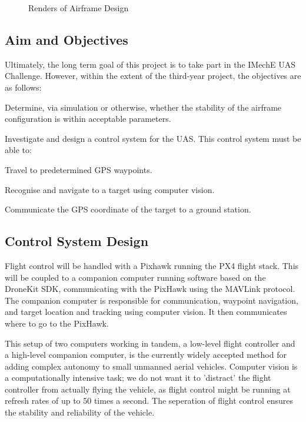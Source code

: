 \documentclass[11pt]{article}
\begin{document}
\begin{figure}[h]
    \caption{Renders of Airframe Design\cite{Ismail_paper}}
    \label{fig:saucy_render}
\end{figure}



\subsection{Aim and Objectives}
Ultimately, the long term goal of this project is to take part in the IMechE UAS Challenge. However, within the extent of the third-year project, the objectives are as follows:

\begin{compactenum}
    \item Determine, via simulation or otherwise, whether the stability of the airframe configuration is within acceptable parameters.
    \item Investigate and design a control system for the UAS. This control system must be able to:
    \begin{compactenum}
        \item Travel to predetermined GPS waypoints.
        \item Recognise and navigate to a target using computer vision.
        \item Communicate the GPS coordinate of the target to a ground station.
    \end{compactenum}
\end{compactenum}

\subsection{Control System Design}
Flight control will be handled with a Pixhawk running the PX4 flight stack. This will be coupled to a companion computer running software based on the DroneKit SDK, communicating with the PixHawk using the MAVLink protocol. The companion computer is responsible for communication, waypoint navigation, and target location and tracking using computer vision. It then communicates where to go to the PixHawk.

This setup of two computers working in tandem, a low-level flight controller and a high-level companion computer, is the currently widely accepted method for adding complex autonomy to small unmanned aerial vehicles. Computer vision is a computationally intensive task; we do not want it to 'distract' the flight controller from actually flying the vehicle, as flight control might be running at refresh rates of up to 50 times a second. The seperation of flight control ensures the stability and reliability of the vehicle.
\end{document}
